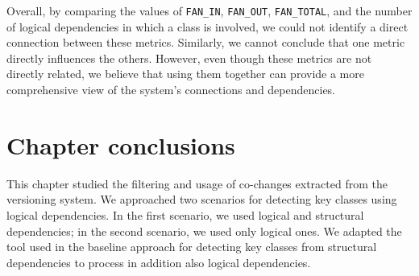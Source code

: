 \begin{table}[!h]
\renewcommand{\arraystretch}{1}
\caption{Top 10 measurements for Hibernate. }
\label{tab:measurementstop:hibernate}
\centering
{}
\end{table}

Overall, by comparing the values of \texttt{FAN\_IN}, \texttt{FAN\_OUT}, \texttt{FAN\_TOTAL}, and the number of logical dependencies in which a class is involved, we could not identify a direct connection between these metrics. Similarly, we cannot conclude that one metric directly influences the others. However, even though these metrics are not directly related, we believe that using them together can provide a more comprehensive view of the system’s connections and dependencies.



\section{Chapter conclusions}
\label{sec:key_class_conclusions}

\hspace{4em}This chapter studied the filtering and usage of co-changes extracted from the versioning system. We approached two scenarios for detecting key classes using logical dependencies. In the first scenario, we used logical and structural dependencies; in the second scenario, we used only logical ones. We adapted the tool used in the baseline approach for detecting key classes from structural dependencies \cite{Finding-key-classes} to process in addition also logical dependencies.

